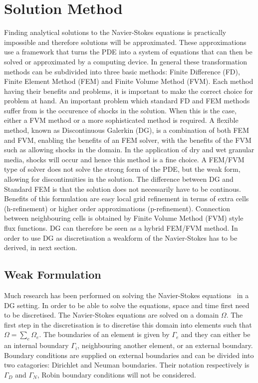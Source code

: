 \documentclass{report}
\begin{document}
\chapter{Solution Method}
\label{c:SolutionMethod}
Finding analytical solutions to the Navier-Stokes equations is practically impossible and therefore solutions will be approximated. These approximations use a framework that turns the PDE into a system of equations that can then be solved or approximated by a computing device. In general these transformation methods can be subdivided into three basic methods: Finite Difference (FD), Finite Element Method (FEM) and Finite Volume Method (FVM). Each method having their benefits and problems, it is important to make the correct choice for problem at hand. 
An important problem which standard FD and FEM methods suffer from is the occurence of shocks in the solution. When this is the case, either a FVM method or a more sophisticated method is required. A flexible method, known as Discontinuous Galerkin (DG), is a combination of both FEM and FVM, enabling the benefits of an FEM solver, with the benefits of the FVM such as allowing shocks in the domain. In the application of dry and wet granular media, shocks will occur and hence this method is a fine choice. A FEM/FVM type of solver does not solve the strong form of the PDE, but the weak form, allowing for discontinuities in the solution. The difference between DG and Standard FEM is that the solution does not necessarily have to be continous. Benefits of this formulation are easy local grid refinement in terms of extra cells (h-refinement) or higher order approximations (p-refinement). Connection between neighbouring cells is obtained by Finite Volume Method (FVM) style flux functions. DG can therefore be seen as a hybrid FEM/FVM method. In order to use DG as discretisation a weakform of the Navier-Stokes has to be derived, in next section.

\section{Weak Formulation}
\label{s:WeakFormulation}
Much research has been performed on solving the Navier-Stokes equations~\cite{} in a DG setting. In order to be able to solve the equations, space and time first need to be discretised. The Navier-Stokes equations are solved on a domain $\Omega$. The first step in the discretisation is to discretise this domain into elements such that $ \Omega = \sum_e \Omega_e$. The boundaries of an element is given by $\Gamma_e$ and they can either be an internal boundary $\Gamma_i$, neighbouring another element, or an external boundary. Boundary conditions are supplied on external boundaries and can be divided into two catagories: Dirichlet and Neuman boundaries. Their notation respectively is $\Gamma_D$ and $\Gamma_N$, Robin boundary conditions will not be considered.
\end{document}
